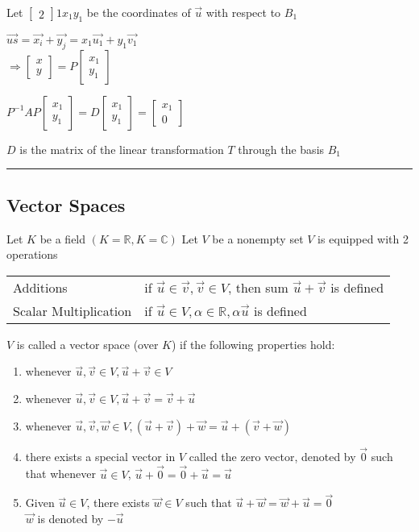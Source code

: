 \documentclass[12pt]{article}
\renewcommand{\v}[1]{\overrightarrow{#1}}
\newcommand\m[1]{\begin{bmatrix}#1\end{bmatrix}}
\newcommand{\real}[0]{\mathbb{R}}
\newcommand{\complex}[0]{\mathbb{C}}
\newcommand{\pp}[1]{\left(#1\right)}
\newcommand{\divider}[0]{\textcolor{lightgray}{\rule{\textwidth}{0.1pt}}}
\begin{document}
Let \(\m21{x_1 y_1}\) be the coordinates of \(\v{u}\) with respect to \(B_1\)

\(\v{us} = \v{x_i} + \v{y_j} = x_1 \v{u_1} + y_1 \v{v_1}\) \\
\(\Rightarrow \m{x \\ y} = P \m{x_1 \\ y_1}\)

\(P^{-1}AP \m{x_1 \\ y_1} = D \m{x_1 \\ y_1} = \m{x_1 \\ 0}\)

\(D\) is the matrix of the linear transformation \(T\) through the basis \(B_1\)

\divider

\subsection{Vector Spaces}

Let \(K\) be a field \(\pp{K = \real, K = \complex}\)
Let \(V\) be a nonempty set
\(V\) is equipped with 2 operations

\begin{tabular}{@{} l l}
	Additions	& if \(\v{u} \in \v{v}, \v{v} \in V\), then sum \(\v{u} + \v{v}\) is defined \\
	Scalar Multiplication & if \(\v{u} \in V, \alpha \in \real, \alpha \v{u}\) is defined
\end{tabular}

\(V\) is called a vector space (over \(K\)) if the following properties hold:

\begin{enumerate}[label=\(A_{\arabic*}\)]
	\item whenever \(\v{u}, \v{v} \in V, \v{u} + \v{v} \in V\)
	\item whenever \(\v{u}, \v{v} \in V, \v{u} + \v{v} = \v{v} + \v{u}\)
	\item whenever \(\v{u}, \v{v}, \v{w} \in V, \pp{\v{u} + \v{v}} + \v{w} = \v{u} + \pp{\v{v} + \v{w}}\)
	\item there exists a special vector in \(V\) called the zero vector, denoted by \(\v{0}\) such that whenever \(\v{u} \in V\), \(\v{u} + \v{0} = \v{0} + \v{u} = \v{u}\)
	\item Given \(\v{u} \in V\), there exists \(\v{w} \in V\) such that \(\v{u} + \v{w} = \v{w} + \v{u} = \v{0}\) \\
	\(\v{w}\) is denoted by \(-\v{u}\)
\end{enumerate}
\end{document}
